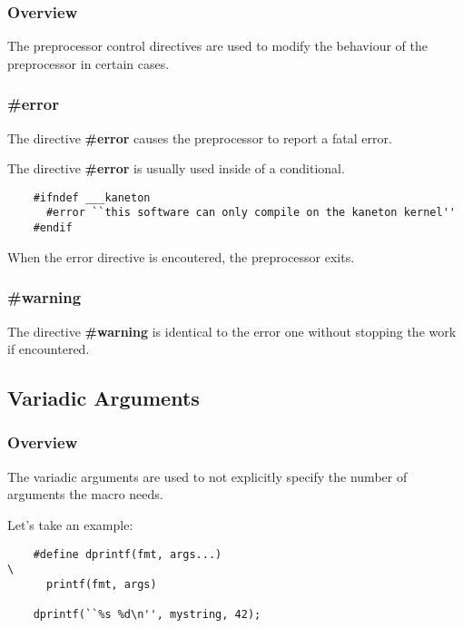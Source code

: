\documentclass[8pt]{beamer}
\newcommand{\nl}[0]{\vspace{0.4cm}}
\begin{document}

\begin{frame}
  \frametitle{Overview}

  The preprocessor control directives are used to modify the behaviour
  of the preprocessor in certain cases.
\end{frame}


\begin{frame}[containsverbatim]
  \frametitle{\textbf{\#error}}

  The directive \textbf{\#error} causes the preprocessor to report a
  fatal error.

  \nl

  The directive \textbf{\#error} is usually used inside of a conditional.

  \begin{verbatim}
    #ifndef ___kaneton
      #error ``this software can only compile on the kaneton kernel''
    #endif
  \end{verbatim}

  When the error directive is encoutered, the preprocessor exits.
\end{frame}


\begin{frame}
  \frametitle{\textbf{\#warning}}

    The directive \textbf{\#warning} is identical to the error one
    without stopping the work if encountered.
\end{frame}

%
%

\subsection{Variadic Arguments}


\begin{frame}[containsverbatim]
  \frametitle{Overview}

  The variadic arguments are used to not explicitly specify the number
  of arguments the macro needs.

  \nl

  Let's take an example:

  \begin{verbatim}
    #define dprintf(fmt, args...)                                       \
      printf(fmt, args)

    dprintf(``%s %d\n'', mystring, 42);
  \end{verbatim}
\end{frame}
\end{document}

